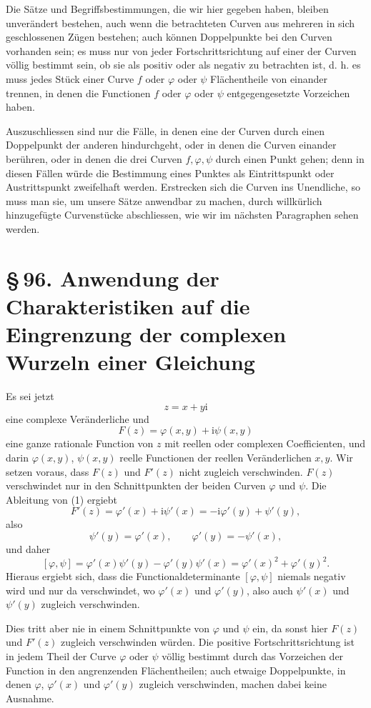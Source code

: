 \documentclass[11pt]{article}
\providecommand{\sect}[2]{\section*{\S\,#1. #2}}
\providecommand{\ii}{\mathrm{i}}
\begin{document}
Die Sätze und Begriffsbestimmungen, die wir hier gegeben haben, bleiben unverändert bestehen, auch wenn die betrachteten Curven aus mehreren in sich geschlossenen Zügen bestehen; auch können Doppelpunkte bei den Curven vorhanden sein; es muss nur von jeder Fortschrittsrichtung auf einer der Curven völlig bestimmt sein, ob sie als positiv oder als negativ zu betrachten ist, d. h. es muss jedes Stück einer Curve $f$ oder $\varphi$ oder $\psi$ Flächentheile von einander trennen, in denen die Functionen $f$ oder $\varphi$ oder $\psi$ entgegengesetzte Vorzeichen haben.

Auszuschliessen sind nur die Fälle, in denen eine der Curven durch einen Doppelpunkt der anderen hindurchgeht, oder in denen die Curven einander berühren, oder in denen die drei Curven $f,\varphi,\psi$ durch einen Punkt gehen; denn in diesen Fällen würde die Bestimmung eines Punktes als Eintrittspunkt oder Austrittspunkt zweifelhaft werden. Erstrecken sich die Curven ins Unendliche, so muss man sie, um unsere Sätze anwendbar zu machen, durch willkürlich hinzugefügte Curvenstücke abschliessen, wie wir im nächsten Paragraphen sehen werden.

\sect{96}{Anwendung der Charakteristiken auf die Eingrenzung der complexen Wurzeln einer Gleichung}

Es sei jetzt
\[
        z=x+y\ii
\]
eine complexe Veränderliche und
\begin{equation}
        F(z)=\varphi(x,y)+\ii\psi(x,y)
\tag{1}
\end{equation}
eine ganze rationale Function von $z$ mit reellen oder complexen Coefficienten, und darin $\varphi(x,y)$, $\psi(x,y)$ reelle Functionen der reellen Veränderlichen $x,y$. Wir setzen voraus, dass $F(z)$ und $F'(z)$ nicht zugleich verschwinden. $F(z)$ verschwindet nur in den Schnittpunkten der beiden Curven $\varphi$ und $\psi$. Die Ableitung von (1) ergiebt
\[
        F'(z)=\varphi'(x)+\ii\psi'(x)=-\ii\varphi'(y)+\psi'(y),
\]
also
\[
        \psi'(y)=\varphi'(x),\qquad \varphi'(y)=-\psi'(x),
\]
und daher
\[
        [\varphi,\psi]=\varphi'(x)\psi'(y)-\varphi'(y)\psi'(x)
        =\varphi'(x)^2+\varphi'(y)^2.
\]
Hieraus ergiebt sich, dass die Functionaldeterminante $[\varphi,\psi]$ niemals negativ wird und nur da verschwindet, wo $\varphi'(x)$ und $\varphi'(y)$, also auch $\psi'(x)$ und $\psi'(y)$ zugleich verschwinden.

Dies tritt aber nie in einem Schnittpunkte von $\varphi$ und $\psi$ ein, da sonst hier $F(z)$ und $F'(z)$ zugleich verschwinden würden. Die positive Fortschrittsrichtung ist in jedem Theil der Curve $\varphi$ oder $\psi$ völlig bestimmt durch das Vorzeichen der Function in den angrenzenden Flächentheilen; auch etwaige Doppelpunkte, in denen $\varphi$, $\varphi'(x)$ und $\varphi'(y)$ zugleich verschwinden, machen dabei keine Ausnahme.
\end{document}
